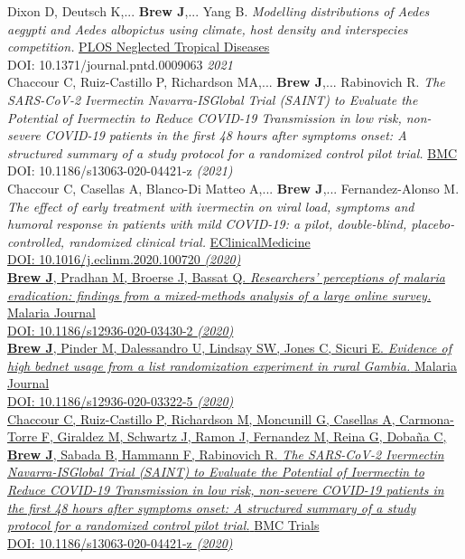 \documentclass[11pt]{article}
\begin{document}
{\noindent Dixon D, Deutsch K,... \textbf{Brew J},... Yang B. \emph{Modelling distributions of Aedes aegypti and Aedes albopictus using climate, host density and interspecies competition.} \href{https://journals.plos.org/plosntds/article?id=10.1371/journal.pntd.0009063}{PLOS Neglected Tropical Diseases} \\ DOI: 10.1371/journal.pntd.0009063 \hfill \emph{2021} \\


\noindent Chaccour C, Ruiz-Castillo P, Richardson MA,... \textbf{Brew J},... Rabinovich R. \emph{The SARS-CoV-2 Ivermectin Navarra-ISGlobal Trial (SAINT) to Evaluate the Potential of Ivermectin to Reduce COVID-19 Transmission in low risk, non-severe COVID-19 patients in the first 48 hours after symptoms onset: A structured summary of a study protocol for a randomized control pilot trial.} \href{https://trialsjournal.biomedcentral.com/articles/10.1186/s13063-020-04421-z}{BMC} \\ DOI: 10.1186/s13063-020-04421-z \hfill \emph{(2021)} \\

\noindent Chaccour C, Casellas A, Blanco-Di Matteo A,... \textbf{Brew J},... Fernandez-Alonso M. \emph{The effect of early treatment with ivermectin on viral load, symptoms and humoral response in patients with mild COVID-19: a pilot, double-blind, placebo-controlled, randomized clinical trial.} \href{https://doi.org/10.1016/j.eclinm.2020.100720}{EClinicalMedicine \\ DOI: 10.1016/j.eclinm.2020.100720 \hfill \emph{(2020)} \\

\noindent \textbf{Brew J}, Pradhan M, Broerse J, Bassat Q. \emph{Researchers’ perceptions of malaria eradication: findings from a mixed-methods analysis of a large online survey.} \href{https://doi.org/10.1186/s12936-020-03430-2}{Malaria Journal} \\ DOI: 10.1186/s12936-020-03430-2 \hfill \emph{(2020)} \\

\noindent \textbf{Brew J}, Pinder M, Dalessandro U, Lindsay SW, Jones C, Sicuri E. \emph{Evidence of high bednet usage from a list randomization experiment in rural Gambia.} \href{https://doi.org/10.1186/s12936-020-03322-5}{Malaria Journal} \\ DOI: 10.1186/s12936-020-03322-5 \hfill \emph{(2020)} \\

\noindent Chaccour C, Ruiz-Castillo P, Richardson M, Moncunill G, Casellas A, Carmona-Torre F, Giraldez M, Schwartz J, Ramon J, Fernandez M, Reina G, Dobaña C, \textbf{Brew J}, Sabada B, Hammann F, Rabinovich R. \emph{The SARS-CoV-2 Ivermectin Navarra-ISGlobal Trial (SAINT) to Evaluate the Potential of Ivermectin to Reduce COVID-19 Transmission in low risk, non-severe COVID-19 patients in the first 48 hours after symptoms onset: A structured summary of a study protocol for a randomized control pilot trial.} \href{https://trialsjournal.biomedcentral.com/articles/10.1186/s13063-020-04421-z}{BMC Trials} \\ DOI: 10.1186/s13063-020-04421-z \hfill \emph{(2020)} \\


}}
\end{document}
